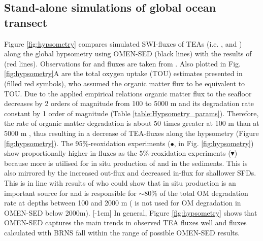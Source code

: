 \documentclass[gmd, manuscript]{copernicus}
\begin{document}
\subsection{Stand-alone simulations of global ocean transect}\label{subsec:globalhypsometry}
Figure \ref{fig:hypsometry} compares simulated SWI-fluxes of TEAs (i.e. ,  and ) along the global hypsometry using OMEN-SED (black lines) with the results of \citet{thullner_global_scale_2009} (red lines). 
Observations for  and  fluxes are taken from \citet{middelburg_denitrification_1996}. Also plotted in Fig. \ref{fig:hypsometry}A are the total oxygen uptake (TOU) estimates presented in 
\citet{thullner_global_scale_2009} (filled red symbols), who assumed the organic matter flux to be equivalent to TOU. 
Due to the applied empirical relations organic matter flux to the seafloor decreases by 2 orders of magnitude from 100 to 5000 m and its degradation rate constant by 1 order of magnitude (Table \ref{table:Hypsometry_params}). 
Therefore, the rate of organic matter degradation is about 50 times greater at 100 m than at 5000 m \citep[compare][]{thullner_global_scale_2009}, thus resulting in a decrease of TEA-fluxes along the 
hypsometry (Figure \ref{fig:hypsometry}). 
The 95\%-reoxidation experiments ($\bullet$, in Fig. \ref{fig:hypsometry}) show proportionally higher  in-fluxes as the 5\%-reoxidation experiments ($\blacktriangledown$) because more  is utilised for 
in situ production of  and  in the sediments. This is also mirrored by the increased  out-flux and decreased  in-flux for shallower SFDs. 
This is in line with results of \citet{thullner_global_scale_2009} who could show that in situ production is an important source for  and is responsible for $\sim$80\% of the total OM degradation rate at depths 
between 100 and 2000 m ( is not used for OM degradation in OMEN-SED below 2000m).
[-1cm]%
In general, Figure \ref{fig:hypsometry} shows that OMEN-SED captures the main trends in observed TEA fluxes well and fluxes calculated with BRNS fall within the range of possible OMEN-SED results. 
\end{document}
